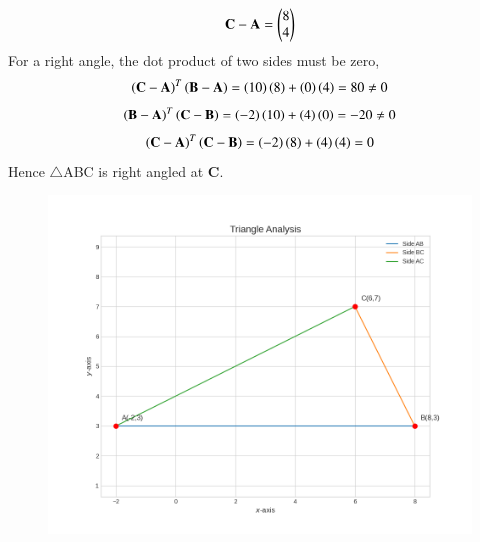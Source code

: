 \documentclass[journal]{IEEEtran}
\begin{document}
\begin{align}
   \mathbf{C}-\mathbf{A}=\begin{pmatrix}8\\4\end{pmatrix}
\end{align}
For a right angle, the dot product of two sides must be zero,
\begin{align}
\left(\mathbf{C}-\mathbf{A}\right)^T\left(\mathbf{B}-\mathbf{A}\right)=\left(10\right)\left(8\right)+\left(0\right)\left(4\right)=80\neq 0
\end{align}
\begin{align}
\left(\mathbf{B}-\mathbf{A}\right)^T\left(\mathbf{C}-\mathbf{B}\right)=\left(-2\right)\left(10\right)+\left(4\right)\left(0\right)=-20\neq 0
\end{align}
\begin{align}
\left(\mathbf{C}-\mathbf{A}\right)^T\left(\mathbf{C}-\mathbf{B}\right)=\left(-2\right)\left(8\right)+\left(4\right)\left(4\right)=0
\end{align}
Hence $\triangle$ABC is right angled at \textbf{C}.
\newpage
\begin{figure}
    \centering
    \includegraphics[width=1\columnwidth]{figs/Figure_1.png}
    \caption{}
    \label{fig:placeholder}
\end{figure}
\end{document}

